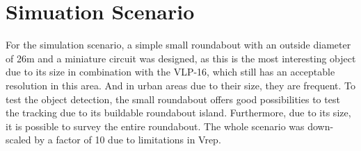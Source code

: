 \documentclass[11pt,oneside,openright]{mpreport}
\begin{document}
\section{Simuation Scenario}


For the simulation scenario, a simple small roundabout with an outside diameter of 26m and a miniature circuit was designed,
as this is the most interesting object due to its size in combination with the VLP-16, which still has an acceptable resolution in this area.
And in urban areas due to their size, they are frequent. To test the object detection, the small roundabout offers good possibilities to test the tracking due to its buildable roundabout island.
Furthermore, due to its size, it is possible to survey the entire roundabout. The whole scenario was down-scaled by a factor of 10 due to limitations in Vrep.

\end{document}

